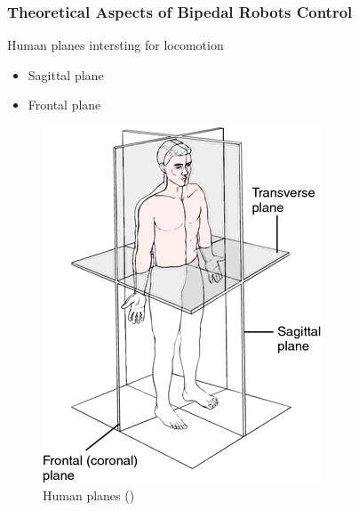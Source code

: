 \documentclass{beamer}
\begin{document}
	\begin{frame}
		\frametitle{Theoretical Aspects of Bipedal Robots Control}
		\begin{block}{Human planes intersting for locomotion}
			\begin{itemize}
				\item
					Sagittal plane
				\item
					Frontal plane
					
			\end{itemize}
		\end{block}
		
		\begin{figure}[h!]
			\begin{minipage}[H]{\linewidth}
				\centering
				\includegraphics[width=0.3\linewidth]{presentation_images/12}
				\caption{Human planes (\cite{medical})}
			\end{minipage}
		\end{figure}
	\end{frame}
	
\end{document}

